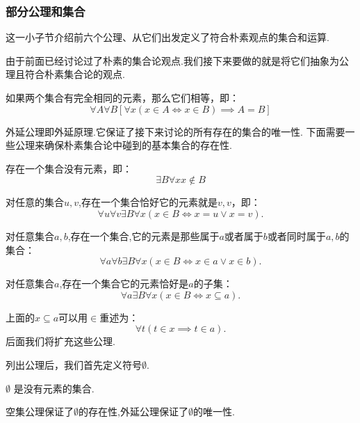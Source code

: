 \subsubsection{部分公理和集合}

这一小子节介绍前六个公理、从它们出发定义了符合朴素观点的集合和运算.

由于前面已经讨论过了朴素的集合论观点.我们接下来要做的就是将它们抽象为公理且符合朴素集合论的观点.

\begin{axiom}
    如果两个集合有完全相同的元素，那么它们相等，即：
    \[\forall A\forall B[\forall x(x\in A\iff x\in B)\implies A=B]\]
\end{axiom}

    外延公理即外延原理.它保证了接下来讨论的所有存在的集合的唯一性.
下面需要一些公理来确保朴素集合论中碰到的基本集合的存在性.
\begin{axiom}
    存在一个集合没有元素，即：
    \[\exists B\forall x x\notin B\]
\end{axiom}

\begin{axiom}
    对任意的集合$u,v$,存在一个集合恰好它的元素就是$v,v$，即：
    \[\forall u\forall v\exists B\forall x(x\in B\iff x=u\vee x=v).\]
\end{axiom}

\begin{axiom}
    对任意集合$a,b$,存在一个集合,它的元素是那些属于$a$或者属于$b$或者同时属于$a,b$的集合：
    \[\forall a\forall b\exists B\forall x(x\in B\iff x\in a\vee x\in b).\]
\end{axiom}

\begin{axiom}
    对任意集合$a$,存在一个集合它的元素恰好是$a$的子集：
    \[\forall a\exists B\forall x(x\in B\iff x\subseteq a).\]
\end{axiom}

上面的$x\subseteq a$可以用$\in$重述为：
\[\forall t(t\in x\implies t\in a).\]
后面我们将扩充这些公理.

列出公理后，我们首先定义符号$\emptyset$.
\begin{definition}
    $\emptyset$ 是没有元素的集合.
\end{definition}

空集公理保证了$\emptyset$的存在性,外延公理保证了$\emptyset$的唯一性.

